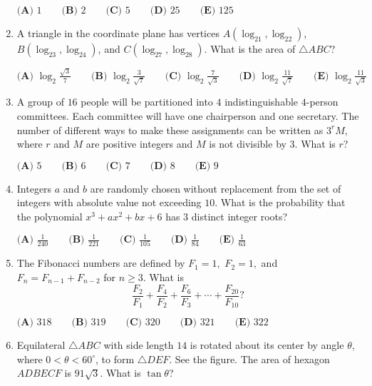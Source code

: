\documentclass{article}
\begin{document}
\begin{enumerate}[label=\arabic*., itemsep=0.5em]
$\textbf{(A) }1 \qquad\textbf{(B) }2 \qquad\textbf{(C) }5 \qquad\textbf{(D) }25 \qquad\textbf{(E) }125 \qquad$\par \vspace{0.5em}\item A triangle in the coordinate plane has vertices $A(\log_21,\log_22)$, $B(\log_23,\log_24)$, and $C(\log_27,\log_28)$. What is the area of $\triangle ABC$?

$
\textbf{(A) }\log_2\frac{\sqrt3}7\qquad
\textbf{(B) }\log_2\frac3{\sqrt7}\qquad
\textbf{(C) }\log_2\frac7{\sqrt3}\qquad
\textbf{(D) }\log_2\frac{11}{\sqrt7}\qquad
\textbf{(E) }\log_2\frac{11}{\sqrt3}\qquad
$\par \vspace{0.5em}\item A group of $16$ people will be partitioned into $4$ indistinguishable $4$-person committees. Each committee will have one chairperson and one secretary. The number of different ways to make these assignments can be written as $3^{r}M$, where $r$ and $M$ are positive integers and $M$ is not divisible by $3$. What is $r$?

$
\textbf{(A) }5 \qquad
\textbf{(B) }6 \qquad
\textbf{(C) }7 \qquad
\textbf{(D) }8 \qquad
\textbf{(E) }9 \qquad$\par \vspace{0.5em}\item Integers $a$ and $b$ are randomly chosen without replacement from the set of integers with absolute value not exceeding $10$. What is the probability that the polynomial $x^3 + ax^2 + bx + 6$ has $3$ distinct integer roots?

$\textbf{(A) }\frac{1}{240} \qquad \textbf{(B) }\frac{1}{221} \qquad \textbf{(C) }\frac{1}{105} \qquad \textbf{(D) }\frac{1}{84} \qquad \textbf{(E) }\frac{1}{63}$\par \vspace{0.5em}\item The Fibonacci numbers are defined by $F_1=1,$ $F_2=1,$ and $F_n=F_{n-1}+F_{n-2}$ for $n\geq 3.$ What is
\begin{equation*}
\dfrac{F_2}{F_1}+\dfrac{F_4}{F_2}+\dfrac{F_6}{F_3}+\cdots+\dfrac{F_{20}}{F_{10}}?
\end{equation*}

$\textbf{(A) }318 \qquad\textbf{(B) }319\qquad\textbf{(C) }320\qquad\textbf{(D) }321\qquad\textbf{(E) }322$\par \vspace{0.5em}\item Equilateral $\triangle ABC$ with side length $14$ is rotated about its center by angle $\theta$, where $0 < \theta < 60^{\circ}$, to form $\triangle DEF$. See the figure. The area of hexagon $ADBECF$ is $91\sqrt{3}$. What is $\tan\theta$?


\end{enumerate}
\end{document}
